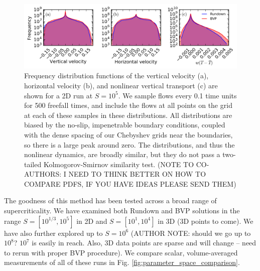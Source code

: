\documentclass[aps, pre, onecolumn, nofootinbib, notitlepage, groupedaddress, amsfonts, amssymb, amsmath, longbibliography]{revtex4-1}
\begin{document}
\begin{figure}[t]
\includegraphics[width=\textwidth]{./figs/pdf_comparison.png}
\caption{Frequency distribution functions of the vertical velocity (a), horizontal velocity (b), and nonlinear
vertical transport (c) are shown for a 2D run at $S = 10^5$.  We sample flows every 0.1 time units for 500 freefall
times, and include the flows at all points on the grid at each of these samples in these distributions.  All
distributions are biased by the no-slip, impenetrable boundary conditions, coupled with the dense spacing of our
Chebyshev grids near the boundaries, so there is a large peak around zero. The distributions, and thus the nonlinear
dynamics, are broadly similar, but they do not pass a two-tailed Kolmogorov-Smirnov similarity test. (NOTE TO
CO-AUTHORS: I NEED TO THINK BETTER ON HOW TO COMPARE PDFS, IF YOU HAVE IDEAS PLEASE SEND THEM)
\label{fig:pdf_comparison} }
\end{figure}



The goodness of this method has been tested across a broad range of supercriticality.  We have
examined both Rundown and BVP solutions in the range $S = [10^{1/3}, 10^5]$ in 2D and
$S = [10^1, 10^4]$ in 3D (3D points to come).  We have also further explored up to $S = 10^6$
(AUTHOR NOTE: should we go up to $10^8$?  $10^7$ is easily in reach. Also, 3D data points are
sparse and will change -- need to rerun with proper BVP procedure).  We compare scalar, 
volume-averaged measurements of all of these runs in Fig. \ref{fig:parameter_space_comparison}.
\end{document}
